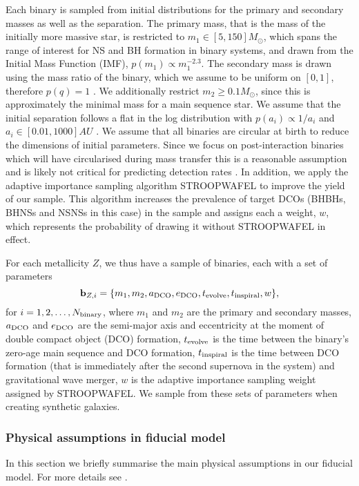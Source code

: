 Each binary is sampled from initial distributions for the primary and secondary masses as well as the separation. The primary mass, that is the mass of the initially more massive star, is restricted to $m_1 \in [5, 150] \unit{M_{\odot}}$, which spans the range of interest for NS and BH formation in binary systems, and drawn from the \citet{Kroupa+2001} Initial Mass Function (IMF), $p(m_1) \propto m_1^{-2.3}$. The secondary mass is drawn using the mass ratio of the binary, which we assume to be uniform on $[0, 1]$, therefore $p(q) = 1$ \citep[consistent e.g. with][]{Sana+2012}. We additionally restrict $m_2 \ge 0.1 \unit{M_{\odot}}$, since this is approximately the minimal mass for a main sequence star. We assume that the initial separation follows a flat in the log distribution with $p(a_i) \propto 1 / a_i$ and $a_i \in [0.01, 1000] \unit{AU}$ \citep{Opik+1924, Abt+1983}. We assume that all binaries are circular at birth to reduce the dimensions of initial parameters. Since we focus on post-interaction binaries which will have circularised during mass transfer this is a reasonable assumption and is likely not critical for predicting detection rates \citep{Hurley+2002, deMink+2015}. In addition, we apply the adaptive importance sampling algorithm STROOPWAFEL \citep{Broekgaarden+2019} to improve the yield of our sample. This algorithm increases the prevalence of target DCOs (BHBHs, BHNSs and NSNSs in this case) in the sample and assigns each a weight, $w$, which represents the probability of drawing it without STROOPWAFEL in effect.

For each metallicity $Z$, we thus have a sample of binaries, each with a set of parameters
\begin{equation}
    \mathbf{b}_{{Z, i}} = \{m_1, m_2, a_{\rm DCO}, e_{\rm DCO}, t_{\rm evolve}, t_{\rm inspiral}, w\},
\end{equation}
for $i = 1, 2, \dots, N_{\rm binary}$, where $m_1$ and $m_2$ are the primary and secondary masses, $a_{\rm DCO}$ and $e_{\rm DCO}$ are the semi-major axis and eccentricity at the moment of double compact object (DCO) formation, $t_{\rm evolve}$ is the time between the binary's zero-age main sequence and DCO formation, $t_{\rm inspiral}$ is the time between DCO formation (that is immediately after the second supernova in the system) and gravitational wave merger, $w$ is the adaptive importance sampling weight assigned by STROOPWAFEL. We sample from these sets of parameters when creating synthetic galaxies.

\subsubsection{Physical assumptions in fiducial model}\label{sec:fiducial_physics}
In this section we briefly summarise the main physical assumptions in our fiducial model. For more details see \citet{Broekgaarden+2021}.

